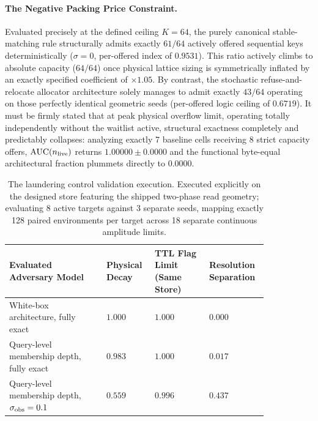 \documentclass{article}
\begin{document}
\paragraph{The Negative Packing Price Constraint.} Evaluated precisely at the defined ceiling $K=64$, the purely canonical stable-matching rule structurally admits exactly $61/64$ actively offered sequential keys deterministically ($\sigma=0$, per-offered index of $0.9531$). This ratio actively climbs to absolute capacity ($64/64$) once physical lattice sizing is symmetrically inflated by an exactly specified coefficient of $\times1.05$. By contrast, the stochastic refuse-and-relocate allocator architecture solely manages to admit exactly $43/64$ operating on those perfectly identical geometric seeds (per-offered logic ceiling of $0.6719$). It must be firmly stated that at peak physical overflow limit, operating totally independently without the waitlist active, structural exactness completely and predictably collapses: analyzing exactly 7 baseline cells receiving 8 strict capacity offers, $\mathrm{AUC}(n_{\rm live})$ returns $1.00000\pm0.0000$ and the functional byte-equal architectural fraction plummets directly to $0.0000$.

\begin{table}[!htb]\centering\small
\caption{The laundering control validation execution. Executed explicitly on the designed store featuring the shipped two-phase read geometry; evaluating 8 active targets against 3 separate seeds, mapping exactly 128 paired environments per target across 18 separate continuous amplitude limits.}
\begin{tabular}{p{0.34\linewidth}p{0.15\linewidth}p{0.19\linewidth}p{0.16\linewidth}}
\toprule
Evaluated Adversary Model & Physical Decay & TTL Flag Limit (Same Store) & Resolution Separation\\
\midrule
White-box architecture, fully exact & $1.000$ & $1.000$ & $0.000$\\
Query-level membership depth, fully exact & $0.983$ & $1.000$ & $0.017$\\
Query-level membership depth, $\sigma_{\rm obs}=0.1$ & $0.559$ & $0.996$ & $0.437$\\
\bottomrule
\end{tabular}
\end{table}
\end{document}
